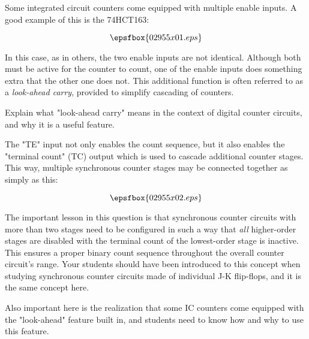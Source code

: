 

Some integrated circuit counters come equipped with multiple enable inputs.  A good example of this is the 74HCT163:

$$\epsfbox{02955x01.eps}$$

In this case, as in others, the two enable inputs are not identical.  Although both must be active for the counter to count, one of the enable inputs does something extra that the other one does not.  This additional function is often referred to as a {\it look-ahead carry}, provided to simplify cascading of counters.

Explain what "look-ahead carry" means in the context of digital counter circuits, and why it is a useful feature.







The "TE" input not only enables the count sequence, but it also enables the "terminal count" (TC) output which is used to cascade additional counter stages.  This way, multiple synchronous counter stages may be connected together as simply as this:

$$\epsfbox{02955x02.eps}$$







The important lesson in this question is that synchronous counter circuits with more than two stages need to be configured in such a way that {\it all} higher-order stages are disabled with the terminal count of the lowest-order stage is inactive.  This ensures a proper binary count sequence throughout the overall counter circuit's range.  Your students should have been introduced to this concept when studying synchronous counter circuits made of individual J-K flip-flops, and it is the same concept here.

Also important here is the realization that some IC counters come equipped with the "look-ahead" feature built in, and students need to know how and why to use this feature.




